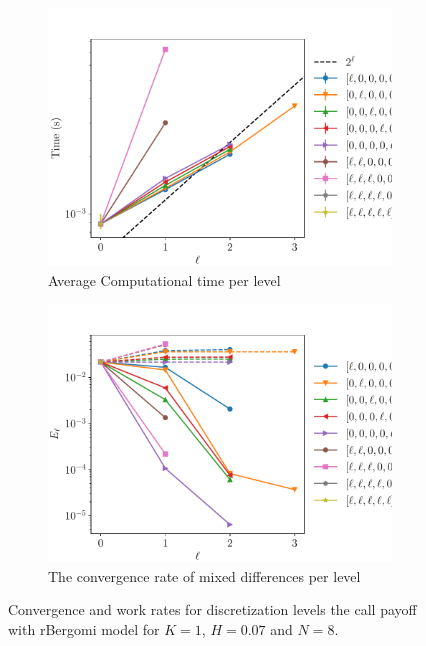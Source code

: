 \documentclass[11pt]{article}
\begin{document}
\begin{figure}[!h]
	\centering
	\begin{subfigure}{.4\textwidth}
		\centering
		\includegraphics[width=0.95\linewidth]{./figures/bergomi_misc/H_007/N_8/level_work.pdf}
		\caption{Average Computational time per level}
		\label{fig:misc_rbergomi_8_steps_sub3}
	\end{subfigure}%
	\begin{subfigure}{.4\textwidth}
		\centering
		\includegraphics[width=0.95\linewidth]{./figures/bergomi_misc/H_007/N_8/levels_error_rate.pdf}
		\caption{  The convergence rate of mixed differences per level}
		\label{fig:misc_rbergomi_8_steps_sub4}
	\end{subfigure}%
	\caption{Convergence and work rates for discretization levels  the call payoff with rBergomi model for $K=1$, $H=0.07$ and $N=8$.}
	\label{fig:misc_rbergomi_8_steps_2}
\end{figure}
\end{document}
